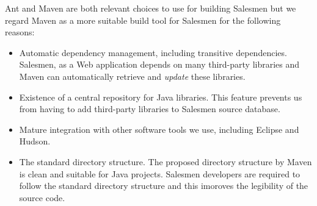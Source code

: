 Ant and Maven are both relevant choices to use for building Salesmen but
we regard Maven as a more suitable build tool for Salesmen for the 
following reasons:

\begin{itemize}
 \item Automatic dependency management, including transitive dependencies.
Salesmen, as a Web application depends on many third-party libraries and
Maven can automatically retrieve and \emph{update} these libraries.
 \item Existence of a central repository for Java libraries. This feature
prevents us from having to add third-party libraries to Salesmen
source database.
 \item Mature integration with other software tools we use, including
Eclipse and Hudson.
\item The standard directory structure. The proposed directory structure
by Maven is clean and suitable for Java projects. Salesmen developers are
required to follow the standard directory structure and this imoroves
the legibility of the source code.
\end{itemize}